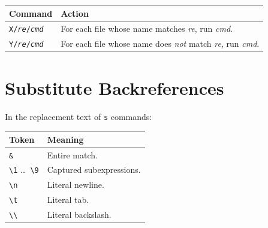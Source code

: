 \begin{longtable}{@{}lp{3.5in}@{}}
\toprule
Command & Action \\
\midrule
\endhead
\texttt{X/\textit{re}/\textit{cmd}} & For each file whose name matches
  \textit{re}, run \textit{cmd}. \\
\texttt{Y/\textit{re}/\textit{cmd}} & For each file whose name does \emph{not}
  match \textit{re}, run \textit{cmd}. \\
\bottomrule
\end{longtable}

\section{Substitute Backreferences}

In the replacement text of \texttt{s} commands:

\begin{longtable}{@{}lp{3.5in}@{}}
\toprule
Token & Meaning \\
\midrule
\endhead
\texttt{\&} & Entire match. \\
\texttt{\textbackslash 1} \ldots\ \texttt{\textbackslash 9} &
  Captured subexpressions. \\
\texttt{\textbackslash n} & Literal newline. \\
\texttt{\textbackslash t} & Literal tab. \\
\texttt{\textbackslash\textbackslash} & Literal backslash. \\
\bottomrule
\end{longtable}
